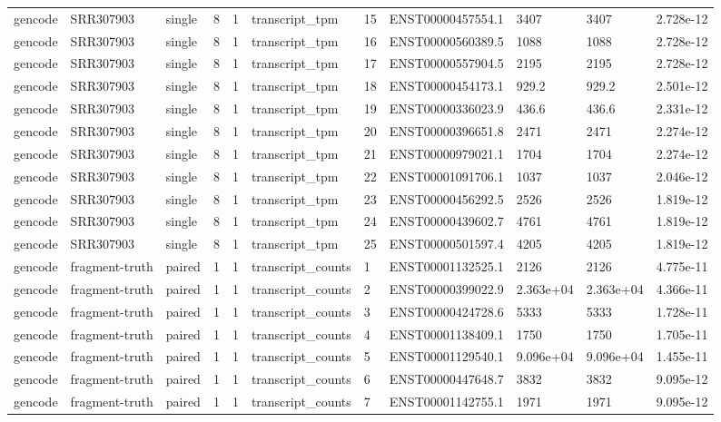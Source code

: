 \begin{tabular}{lllllllllll}
gencode & SRR307903 & single & 8 & 1 & transcript\_tpm & 15 & ENST00000457554.1 & 3407 & 3407 & 2.728e-12 \\
gencode & SRR307903 & single & 8 & 1 & transcript\_tpm & 16 & ENST00000560389.5 & 1088 & 1088 & 2.728e-12 \\
gencode & SRR307903 & single & 8 & 1 & transcript\_tpm & 17 & ENST00000557904.5 & 2195 & 2195 & 2.728e-12 \\
gencode & SRR307903 & single & 8 & 1 & transcript\_tpm & 18 & ENST00000454173.1 & 929.2 & 929.2 & 2.501e-12 \\
gencode & SRR307903 & single & 8 & 1 & transcript\_tpm & 19 & ENST00000336023.9 & 436.6 & 436.6 & 2.331e-12 \\
gencode & SRR307903 & single & 8 & 1 & transcript\_tpm & 20 & ENST00000396651.8 & 2471 & 2471 & 2.274e-12 \\
gencode & SRR307903 & single & 8 & 1 & transcript\_tpm & 21 & ENST00000979021.1 & 1704 & 1704 & 2.274e-12 \\
gencode & SRR307903 & single & 8 & 1 & transcript\_tpm & 22 & ENST00001091706.1 & 1037 & 1037 & 2.046e-12 \\
gencode & SRR307903 & single & 8 & 1 & transcript\_tpm & 23 & ENST00000456292.5 & 2526 & 2526 & 1.819e-12 \\
gencode & SRR307903 & single & 8 & 1 & transcript\_tpm & 24 & ENST00000439602.7 & 4761 & 4761 & 1.819e-12 \\
gencode & SRR307903 & single & 8 & 1 & transcript\_tpm & 25 & ENST00000501597.4 & 4205 & 4205 & 1.819e-12 \\
gencode & fragment-truth & paired & 1 & 1 & transcript\_counts & 1 & ENST00001132525.1 & 2126 & 2126 & 4.775e-11 \\
gencode & fragment-truth & paired & 1 & 1 & transcript\_counts & 2 & ENST00000399022.9 & 2.363e+04 & 2.363e+04 & 4.366e-11 \\
gencode & fragment-truth & paired & 1 & 1 & transcript\_counts & 3 & ENST00000424728.6 & 5333 & 5333 & 1.728e-11 \\
gencode & fragment-truth & paired & 1 & 1 & transcript\_counts & 4 & ENST00001138409.1 & 1750 & 1750 & 1.705e-11 \\
gencode & fragment-truth & paired & 1 & 1 & transcript\_counts & 5 & ENST00001129540.1 & 9.096e+04 & 9.096e+04 & 1.455e-11 \\
gencode & fragment-truth & paired & 1 & 1 & transcript\_counts & 6 & ENST00000447648.7 & 3832 & 3832 & 9.095e-12 \\
gencode & fragment-truth & paired & 1 & 1 & transcript\_counts & 7 & ENST00001142755.1 & 1971 & 1971 & 9.095e-12 \\

\end{tabular}
